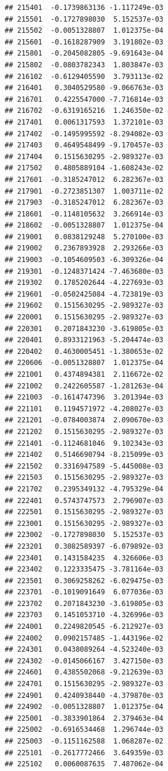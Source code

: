 \documentclass[ignorenonframetext,]{beamer}
\begin{document}
\begin{frame}[fragile]
\begin{verbatim}
## 215401  -0.1739863136 -1.117249e-03
## 215501  -0.1727898030  5.152537e-03
## 215502  -0.0051328807  1.012375e-04
## 215601  -0.1618287909  3.191802e-03
## 215801  -0.2045082805 -9.691643e-04
## 215802  -0.0803782343  1.803847e-03
## 216102  -0.6129405590  3.793113e-02
## 216401   0.3040529580 -9.066763e-03
## 216701   0.4225547000 -7.716814e-03
## 216702  -0.6319165216  1.246350e-02
## 217401   0.0061317593  1.372101e-03
## 217402  -0.1495995592 -8.294082e-03
## 217403   0.4649548499 -9.170457e-03
## 217404   0.1515630295 -2.989327e-03
## 217502   0.4805889104 -1.608243e-02
## 217601  -0.3185247012  6.282367e-03
## 217901  -0.2723851307  1.003711e-02
## 217903  -0.3185247012  6.282367e-03
## 218601  -0.1148105632  3.266914e-03
## 218602  -0.0051328807  1.012375e-04
## 219001   0.0838129248  5.270100e-03
## 219002   0.2367893928  2.293266e-03
## 219003  -0.1054609503 -6.309326e-04
## 219301  -0.1248371424 -7.463680e-03
## 219302   0.1785202644 -4.227693e-03
## 219601  -0.0502425084 -4.723819e-03
## 219602   0.1515630295 -2.989327e-03
## 220001   0.1515630295 -2.989327e-03
## 220301   0.2071843230 -3.619805e-03
## 220401   0.8933121963 -5.204474e-03
## 220402   0.4630005451 -1.380653e-02
## 220606  -0.0051328807  1.012375e-04
## 221001   0.4374894381  2.116672e-02
## 221002   0.2422605587 -1.281263e-04
## 221003  -0.1614747396  3.201394e-03
## 221101   0.1194571972 -4.208027e-03
## 221201  -0.0784003874  2.090670e-03
## 221202   0.1515630295 -2.989327e-03
## 221401  -0.1124681046  9.102343e-03
## 221402   0.5146690794 -8.215099e-03
## 221502   0.3316947589 -5.445008e-03
## 221503   0.1515630295 -2.989327e-03
## 221702   0.2395349132 -4.795329e-04
## 222401   0.5743747573  2.796907e-03
## 222501   0.1515630295 -2.989327e-03
## 223001   0.1515630295 -2.989327e-03
## 223002  -0.1727898030  5.152537e-03
## 223201   0.3082589397 -6.079892e-03
## 223401   0.1431584235  4.326606e-03
## 223402   0.1223335475 -3.781164e-03
## 223501   0.3069258262 -6.029475e-03
## 223701  -0.1019091649  6.077036e-03
## 223702   0.2071843230 -3.619805e-03
## 223703   0.1451053710 -4.326996e-03
## 224001   0.2249820545 -6.212927e-03
## 224002   0.0902157485 -1.443196e-02
## 224301   0.0438089264 -4.523240e-03
## 224302  -0.0145066167  3.427150e-03
## 224601   0.4385502068 -9.212639e-03
## 224701   0.1515630295 -2.989327e-03
## 224901   0.4240938440 -4.379870e-03
## 224902  -0.0051328807  1.012375e-04
## 225001  -0.3833901864  2.379463e-04
## 225002  -0.6916534468  1.296744e-03
## 225003  -0.1151162588  1.068287e-02
## 225101  -0.2617772466  3.649359e-03
## 225102   0.0060087635  7.487062e-04

\end{verbatim}
\end{frame}
\end{document}
